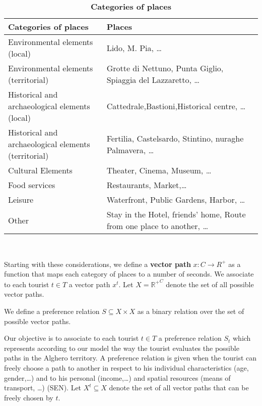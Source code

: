\documentclass[version=last, pagesize, twoside=semi, DIV=calc, 12pt, a4paper, french, english]{scrartcl}
\begin{document}
\begin{table}[h]
\begin{tabular}{ll}
\hline
\textbf{Categories of places}&\textbf{Places}\\
\hline
\parbox{5cm}{Environmental elements (local)}&\parbox{6cm}{Lido, M. Pia, \dots}\\
\parbox{5cm}{Environmental elements (territorial)}&\parbox{6cm}{Grotte di Nettuno, Punta Giglio, Spiaggia del Lazzaretto, \dots}\\
\parbox{5cm}{Historical and archaeological elements (local)}&\parbox{6cm}{Cattedrale,Bastioni,Historical centre, \dots}\\
\parbox{5cm}{Historical and archaeological elements (territorial)}&\parbox{6cm}{Fertilia, Castelsardo, Stintino, nuraghe Palmavera, \dots}\\
\parbox{5cm}{Cultural Elements}&\parbox{6cm}{Theater, Cinema, Museum, \dots}\\
\parbox{5cm}{Food services}&\parbox{6cm}{Restaurants, Market,\dots}\\
\parbox{5cm}{Leisure}&\parbox{6cm}{Waterfront, Public Gardens, Harbor, \dots}\\
\parbox{5cm}{Other}&\parbox{6cm}{Stay in the Hotel, friends' home, Route from one place to another, \dots}\\
\hline
\end{tabular}

\caption{\textbf{Categories of places}}\
\label{Table1}
\end{table}

Starting with these considerations, we define a \textbf{vector path} $x: C \rightarrow R^+$ as a function that maps each category of places to a number of seconds.
We associate to each tourist $t \in T $ a vector path $x^t$.
Let $X={\mathbb{R}^+}^C$ denote the set of all possible vector paths.

We define a preference relation $S \subseteq X \times X $ as a binary relation over the set of possible vector paths.

Our objective is to associate to each tourist $t \in T$ a preference relation $S_t$ which represents according to our model the way the tourist evaluates the possible paths in the Alghero territory. A preference relation is given when the tourist can freely choose a path to another in respect to his individual characteristics (age, gender,\dots) and to his personal (income,\dots) and spatial resources (means of transport, \dots) (SEN). Let $X^t {\subseteq}X$ denote the set of all vector paths that can be freely  chosen by $t$.
\end{document}
